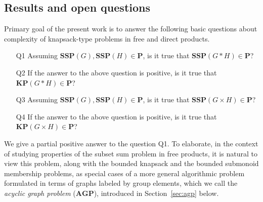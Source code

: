 \documentclass[10pt]{amsart}
\theoremstyle{definition}
\def\P{{\mathbf{P}}}
\def\SSP{{\mathbf{SSP}}}
\def\KP{{\mathbf{KP}}}
\def\AGP{{\mathbf{AGP}}}
\begin{document}
\subsection{Results and open questions}\label{sub:results}
Primary goal of the present work is to answer the following basic questions about complexity of knapsack-type problems in free and direct products.
\begin{itemize}
\item[Q1] Assuming $\SSP(G),\SSP(H)\in\P$, is it true that $\SSP(G*H)\in\P$?
\item[Q2] If the answer to the above question is positive, is it true that $\KP(G*H)\in\P$?
\item[Q3] Assuming $\SSP(G),\SSP(H)\in\P$, is it true that $\SSP(G\times H)\in\P$?
\item[Q4] If the answer to the above question is positive, is it true that $\KP(G\times H)\in\P$?
\end{itemize}

We give a partial positive answer to the question Q1. To elaborate, in the context of studying properties of the subset sum problem in free products, it is natural to view this problem, along with the bounded knapsack and the bounded submonoid membership problems,
as special cases of a more general algorithmic problem formulated in terms of graphs labeled by group elements, which we call the {\em acyclic graph problem} ($\AGP$), introduced in Section~\ref{sec:agp} below.
\end{document}

